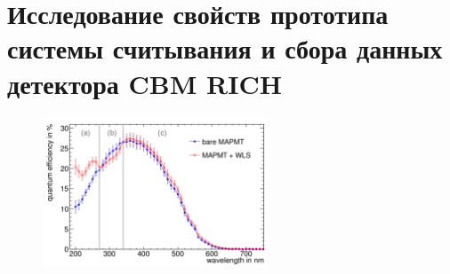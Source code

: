 \chapter{Исследование свойств прототипа системы считывания и сбора данных детектора CBM RICH}\label{sec:secAnalysisResults}


\begin{figure}[H]
\centering
\includegraphics[width=0.6\textwidth]{pictures/QEcurvesKopfer.png}
\caption{}
\label{fig:QEcurvesKopfer}
\end{figure}










